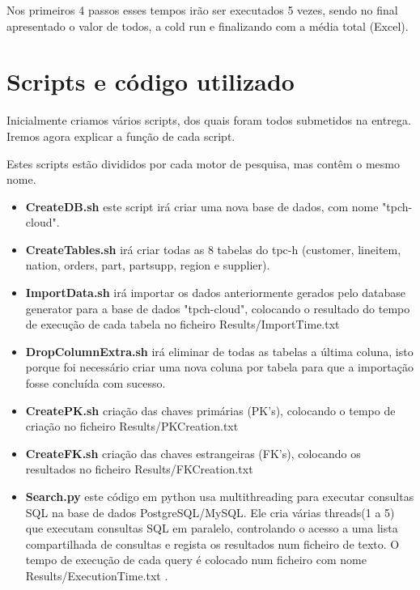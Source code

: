 \documentclass{article}
\begin{document}
\texttt{}\par Nos primeiros 4 passos esses tempos irão ser executados 5 vezes, sendo no final apresentado o valor de todos, a cold run e finalizando com a média total (Excel).\\

\section{Scripts e código utilizado}
\texttt{}\par Inicialmente criamos vários scripts, dos quais foram todos submetidos na entrega. Iremos agora explicar a função de cada script.\\

\texttt{}\par Estes scripts estão divididos por cada motor de pesquisa, mas contêm o mesmo nome.\\

\begin{itemize}
    \item \textbf{CreateDB.sh} este script irá criar uma nova base de dados, com nome "tpch-cloud".
    \item \textbf{CreateTables.sh} irá criar todas as 8 tabelas do tpc-h (customer, lineitem, nation, orders, part, partsupp, region e supplier).
    \item \textbf{ImportData.sh} irá importar os dados anteriormente gerados pelo database generator para a base de dados "tpch-cloud", colocando o resultado do tempo de execução de cada tabela no ficheiro Results/ImportTime.txt
    \item \textbf{DropColumnExtra.sh} irá eliminar de todas as tabelas a última coluna, isto porque foi necessário criar uma nova coluna por tabela para que a importação fosse concluída com sucesso.
    \item \textbf{CreatePK.sh} criação das chaves primárias (PK's), colocando o tempo de criação no ficheiro Results/PKCreation.txt
    \item \textbf{CreateFK.sh} criação das chaves estrangeiras (FK's), colocando os resultados no ficheiro Results/FKCreation.txt
    \item \textbf{Search.py} este código em python usa multithreading para executar consultas SQL na base de dados PostgreSQL/MySQL. Ele cria várias threads(1 a 5) que executam consultas SQL em paralelo, controlando o acesso a uma lista compartilhada de consultas e regista os resultados num ficheiro de texto. O tempo de execução de cada query é colocado num ficheiro com nome Results/ExecutionTime.txt .
     
\end{itemize}
\end{document}
